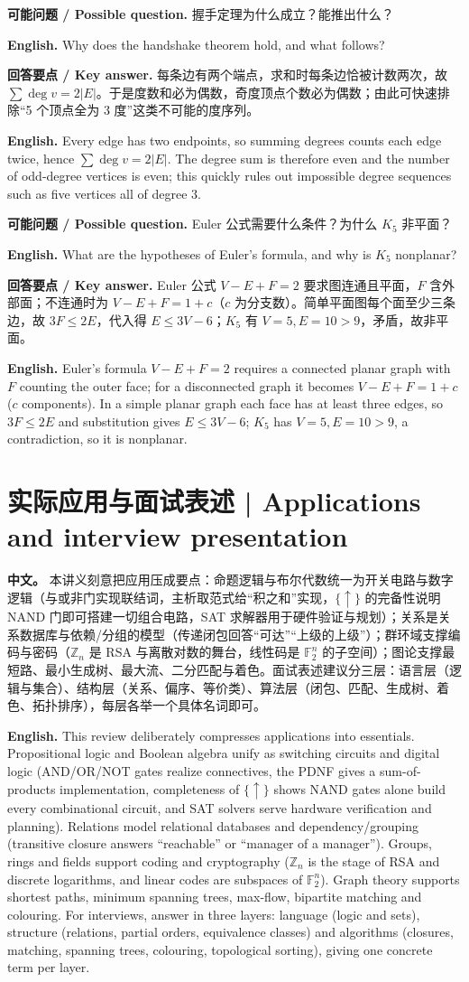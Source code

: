 \documentclass[UTF8,11pt,a4paper]{ctexart}
\newcommand{\EN}[1]{\par\noindent \textbf{English.} #1\par}
\newcommand{\ASK}[4]{\par\noindent \textbf{可能问题 / Possible question.} #1\par\EN{#2}\noindent \textbf{回答要点 / Key answer.} #3\par\EN{#4}\medskip}
\newcommand{\APS}[2]{\par\noindent\textbf{中文。} #1\par\noindent\textbf{English.} #2\par}
\begin{document}
\ASK{握手定理为什么成立？能推出什么？}{Why does the handshake theorem hold, and what follows?}{每条边有两个端点，求和时每条边恰被计数两次，故 $\sum\deg v=2|E|$。于是度数和必为偶数，奇度顶点个数必为偶数；由此可快速排除“5 个顶点全为 3 度”这类不可能的度序列。}{Every edge has two endpoints, so summing degrees counts each edge twice, hence $\sum\deg v=2|E|$. The degree sum is therefore even and the number of odd-degree vertices is even; this quickly rules out impossible degree sequences such as five vertices all of degree $3$.}
\ASK{Euler 公式需要什么条件？为什么 $K_5$ 非平面？}{What are the hypotheses of Euler's formula, and why is $K_5$ nonplanar?}{Euler 公式 $V-E+F=2$ 要求图连通且平面，$F$ 含外部面；不连通时为 $V-E+F=1+c$（$c$ 为分支数）。简单平面图每个面至少三条边，故 $3F\le2E$，代入得 $E\le3V-6$；$K_5$ 有 $V=5,E=10>9$，矛盾，故非平面。}{Euler's formula $V-E+F=2$ requires a connected planar graph with $F$ counting the outer face; for a disconnected graph it becomes $V-E+F=1+c$ ($c$ components). In a simple planar graph each face has at least three edges, so $3F\le2E$ and substitution gives $E\le3V-6$; $K_5$ has $V=5,E=10>9$, a contradiction, so it is nonplanar.}

\section*{实际应用与面试表述 | Applications and interview presentation}
\APS{本讲义刻意把应用压成要点：命题逻辑与布尔代数统一为开关电路与数字逻辑（与或非门实现联结词，主析取范式给“积之和”实现，$\{\uparrow\}$ 的完备性说明 NAND 门即可搭建一切组合电路，SAT 求解器用于硬件验证与规划）；关系是关系数据库与依赖/分组的模型（传递闭包回答“可达”“上级的上级”）；群环域支撑编码与密码（$\mathbb Z_n$ 是 RSA 与离散对数的舞台，线性码是 $\mathbb F_2^n$ 的子空间）；图论支撑最短路、最小生成树、最大流、二分匹配与着色。面试表述建议分三层：语言层（逻辑与集合）、结构层（关系、偏序、等价类）、算法层（闭包、匹配、生成树、着色、拓扑排序），每层各举一个具体名词即可。}{This review deliberately compresses applications into essentials. Propositional logic and Boolean algebra unify as switching circuits and digital logic (AND/OR/NOT gates realize connectives, the PDNF gives a sum-of-products implementation, completeness of $\{\uparrow\}$ shows NAND gates alone build every combinational circuit, and SAT solvers serve hardware verification and planning). Relations model relational databases and dependency/grouping (transitive closure answers ``reachable'' or ``manager of a manager''). Groups, rings and fields support coding and cryptography ($\mathbb Z_n$ is the stage of RSA and discrete logarithms, and linear codes are subspaces of $\mathbb F_2^n$). Graph theory supports shortest paths, minimum spanning trees, max-flow, bipartite matching and colouring. For interviews, answer in three layers: language (logic and sets), structure (relations, partial orders, equivalence classes) and algorithms (closures, matching, spanning trees, colouring, topological sorting), giving one concrete term per layer.}
\end{document}
